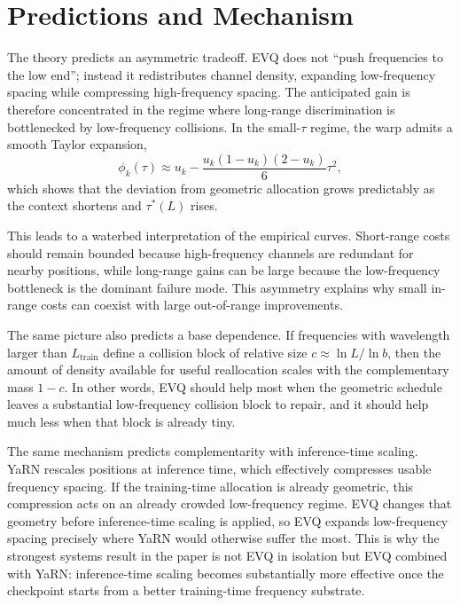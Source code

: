 \section{Predictions and Mechanism}

The theory predicts an asymmetric tradeoff. EVQ does not ``push frequencies to the low end''; instead it redistributes channel density, expanding low-frequency spacing while compressing high-frequency spacing. The anticipated gain is therefore concentrated in the regime where long-range discrimination is bottlenecked by low-frequency collisions. In the small-\(\tau\) regime, the warp admits a smooth Taylor expansion,
\begin{equation}
\phi_k(\tau)\approx u_k-\frac{u_k(1-u_k)(2-u_k)}{6}\tau^2,
\end{equation}
which shows that the deviation from geometric allocation grows predictably as the context shortens and \(\tau^*(L)\) rises.

This leads to a waterbed interpretation of the empirical curves. Short-range costs should remain bounded because high-frequency channels are redundant for nearby positions, while long-range gains can be large because the low-frequency bottleneck is the dominant failure mode. This asymmetry explains why small in-range costs can coexist with large out-of-range improvements.

The same picture also predicts a base dependence. If frequencies with wavelength larger than \(L_{\mathrm{train}}\) define a collision block of relative size \(c \approx \ln L / \ln b\), then the amount of density available for useful reallocation scales with the complementary mass \(1-c\). In other words, EVQ should help most when the geometric schedule leaves a substantial low-frequency collision block to repair, and it should help much less when that block is already tiny.

The same mechanism predicts complementarity with inference-time scaling. YaRN rescales positions at inference time, which effectively compresses usable frequency spacing. If the training-time allocation is already geometric, this compression acts on an already crowded low-frequency regime. EVQ changes that geometry before inference-time scaling is applied, so EVQ expands low-frequency spacing precisely where YaRN would otherwise suffer the most. This is why the strongest systems result in the paper is not EVQ in isolation but EVQ combined with YaRN: inference-time scaling becomes substantially more effective once the checkpoint starts from a better training-time frequency substrate.

